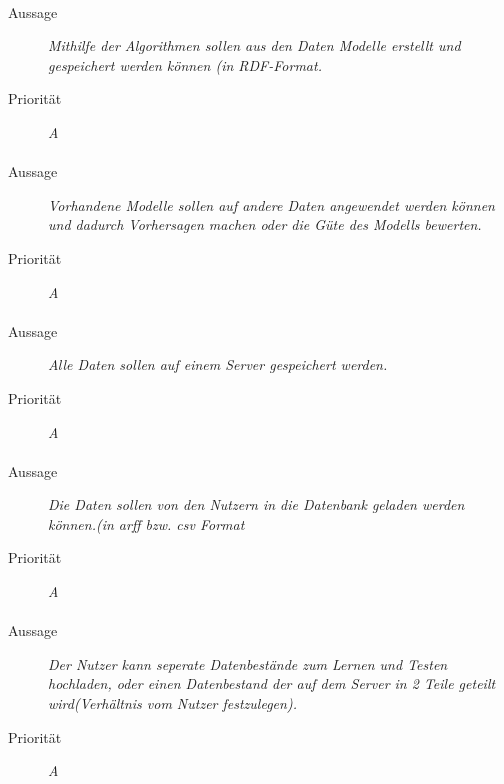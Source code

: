 \paragraph{}
\begin{description}
\item[Aussage] \textit{Mithilfe der Algorithmen sollen aus den Daten Modelle erstellt und gespeichert werden können (in \gls{RDF}-Format.}
\item[Priorität] \textit{A}
\end{description}

\paragraph{}
\begin{description}
\item[Aussage] \textit{Vorhandene Modelle sollen auf andere Daten angewendet werden können und dadurch Vorhersagen machen oder die Güte des Modells bewerten.}
\item[Priorität] \textit{A}
\end{description}

\paragraph{}
\begin{description}
\item[Aussage] \textit{Alle Daten sollen auf einem Server gespeichert werden.}
\item[Priorität] \textit{A}
\end{description}

\paragraph{}
\begin{description}
\item[Aussage] \textit{Die Daten sollen von den Nutzern in die Datenbank geladen werden können.(in \gls{arff} bzw. \gls{csv} Format }
\item[Priorität] \textit{A}
\end{description}


\paragraph{}
\begin{description}
\item[Aussage] \textit{Der Nutzer kann seperate Datenbestände zum Lernen und Testen hochladen, oder einen Datenbestand der auf dem Server in 2 Teile geteilt wird(Verhältnis vom Nutzer festzulegen).}
\item[Priorität] \textit{A}
\end{description}

